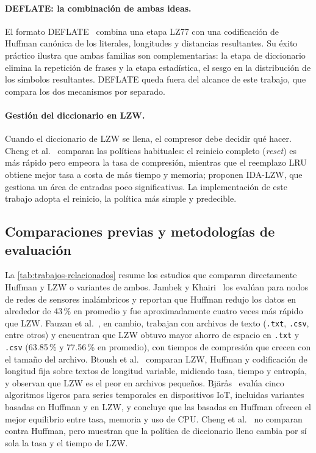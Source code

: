 \paragraph{DEFLATE: la combinación de ambas ideas.} El formato DEFLATE~\cite{rfc1951} combina
una etapa LZ77 con una codificación de Huffman canónica de los literales, longitudes y
distancias resultantes. Su éxito práctico ilustra que ambas familias son complementarias: la
etapa de diccionario elimina la repetición de frases y la etapa estadística, el sesgo en la
distribución de los símbolos resultantes. DEFLATE queda fuera del alcance de este trabajo, que
compara los dos mecanismos por separado.

\paragraph{Gestión del diccionario en LZW.} Cuando el diccionario de LZW se llena, el
compresor debe decidir qué hacer. Cheng et al.~\cite{cheng2021} comparan las políticas
habituales: el reinicio completo (\emph{reset}) es más rápido pero empeora la tasa de
compresión, mientras que el reemplazo LRU obtiene mejor tasa a costa de más tiempo y memoria;
proponen IDA-LZW, que gestiona un área de entradas poco significativas. La implementación de
este trabajo adopta el reinicio, la política más simple y predecible.

\subsection{Comparaciones previas y metodologías de evaluación}
\label{sec:ea-comparaciones}
La \cref{tab:trabajos-relacionados} resume los estudios que comparan directamente Huffman y
LZW o variantes de ambos. Jambek y Khairi~\cite{jambek2014} los evalúan para nodos de redes de
sensores inalámbricos y reportan que Huffman redujo los datos en alrededor de 43\,\% en
promedio y fue aproximadamente cuatro veces más rápido que LZW. Fauzan et
al.~\cite{fauzan2022}, en cambio, trabajan con archivos de texto (\texttt{.txt}, \texttt{.csv},
entre otros) y encuentran que LZW obtuvo mayor ahorro de espacio en \texttt{.txt} y
\texttt{.csv} (63.85\,\% y 77.56\,\% en promedio), con tiempos de compresión que crecen con
el tamaño del archivo. Btoush et al.~\cite{btoush2008} comparan LZW, Huffman y codificación de
longitud fija sobre textos de longitud variable, midiendo tasa, tiempo y entropía, y observan
que LZW es el peor en archivos pequeños. Bjärås~\cite{bjaras2019} evalúa cinco algoritmos
ligeros para series temporales en dispositivos IoT, incluidas variantes basadas en Huffman y en
LZW, y concluye que las basadas en Huffman ofrecen el mejor equilibrio entre tasa, memoria y
uso de CPU. Cheng et al.~\cite{cheng2021} no comparan contra Huffman, pero muestran que la
política de diccionario lleno cambia por sí sola la tasa y el tiempo de LZW.

